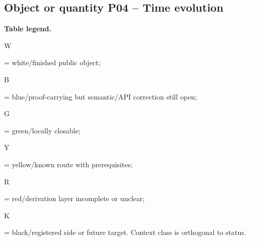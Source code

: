 \subsection*{Object or quantity P04 -- Time evolution}
\hypertarget{objproof:P04}{}
\par\smallskip\noindent\begin{minipage}{0.99\linewidth}\footnotesize\raggedright\textbf{Table legend.} \colorbox{white}{\strut W} = white/finished public object; \colorbox{cyan!20}{\strut B} = blue/proof-carrying but semantic/API correction still open; \colorbox{green!18}{\strut G} = green/locally closable; \colorbox{yellow!25}{\strut Y} = yellow/known route with prerequisites; \colorbox{red!20}{\strut R} = red/derivation layer incomplete or unclear; \colorbox{black!18}{\strut K} = black/registered side or future target. Context class is orthogonal to status.\end{minipage}\par\vspace{0.25em}
